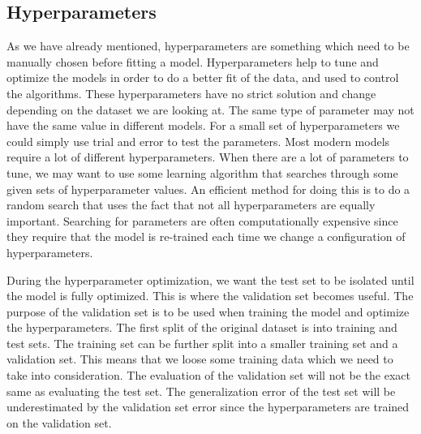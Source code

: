 \documentclass[a4paper, american, 12pt]{report}
\begin{document}
	\subsection{Hyperparameters}
	\label{subsect:Theory-Hyperparameters}
	As we have already mentioned, hyperparameters are something which need to be manually chosen before fitting a model. Hyperparameters help to tune and optimize the models in order to do a better fit of the data, and used to control the algorithms. These hyperparameters have no strict solution and change depending on the dataset we are looking at. The same type of parameter may not have the same value in different models. For a small set of hyperparameters we could simply use trial and error to test the parameters. Most modern models require a lot of different hyperparameters. When there are a lot of parameters to tune, we may want to use some learning algorithm that searches through some given sets of hyperparameter values. An efficient method for doing this is to do a random search that uses the fact that not all hyperparameters are equally important. Searching for parameters are often computationally expensive since they require that the model is re-trained each time we change a configuration of hyperparameters.
	
	During the hyperparameter optimization, we want the test set to be isolated until the model is fully optimized. This is where the validation set becomes useful. The purpose of the validation set is to be used when training the model and optimize the hyperparameters. The first split of the original dataset is into training and test sets. The training set can be further split into a smaller training set and a validation set. This means that we loose some training data which we need to take into consideration. The evaluation of the validation set will not be the exact same as evaluating the test set. The generalization error of the test set will be underestimated by the validation set error since the hyperparameters are trained on the validation set.
	
	
\end{document}
